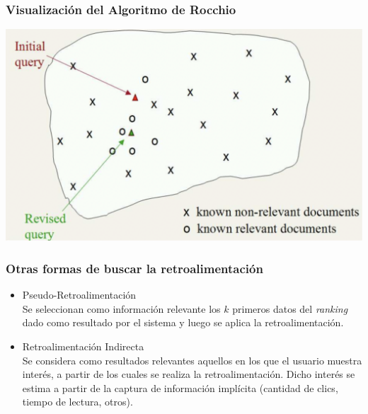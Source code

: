 \documentclass[
10pt, %
aspectratio=169, %
]{beamer}
\begin{document}
	\begin{frame}
		
		\frametitle{Visualización del Algoritmo de Rocchio}
		
		\centering
		\includegraphics[scale=0.35]{q2.png}
		
	\end{frame}
	
	\begin{frame}
		
		\frametitle{Otras formas de buscar la retroalimentación}
		
		\begin{itemize}
			\item Pseudo-Retroalimentación \\ 
			Se seleccionan como información relevante los $k$ primeros datos del \emph{ranking} dado como resultado por el sistema y luego se aplica la retroalimentación.
			
			\item Retroalimentación Indirecta \\ 
			Se considera como resultados relevantes aquellos en los que el usuario muestra interés, a partir de los cuales se realiza la retroalimentación. Dicho interés se estima a partir de la captura de información implícita (cantidad de clics, tiempo de lectura, otros).
		\end{itemize}
		
	\end{frame}
	
\end{document}
